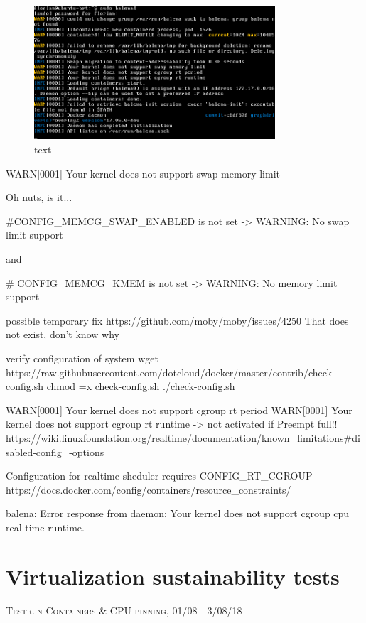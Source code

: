 \documentclass[]{scrartcl}
\begin{document}
\begin{figure}
	\centering
	\includegraphics[width=0.8\textwidth]{balena-err}
	\caption{text}
\end{figure}

WARN[0001] Your kernel does not support swap memory limit 

Oh nuts, is it...

\#CONFIG\_MEMCG\_SWAP\_ENABLED is not set -> WARNING: No swap limit support

and

\# CONFIG\_MEMCG\_KMEM is not set -> WARNING: No memory limit support

possible temporary fix https://github.com/moby/moby/issues/4250
That does not exist, don't know why


verify configuration of system
wget https://raw.githubusercontent.com/dotcloud/docker/master/contrib/check-config.sh
chmod =x check-config.sh
./check-config.sh


WARN[0001] Your kernel does not support cgroup rt period 
WARN[0001] Your kernel does not support cgroup rt runtime 
-> not activated if Preempt full!!
https://wiki.linuxfoundation.org/realtime/documentation/known_limitations#disabled-config_-options


Configuration for realtime sheduler requires CONFIG\_RT\_CGROUP
https://docs.docker.com/config/containers/resource_constraints/

balena: Error response from daemon: Your kernel does not support cgroup cpu real-time runtime.



\section{Virtualization sustainability tests}

{\small\textsc{Testrun Containers \& CPU pinning, 01/08 - 3/08/18} \bigskip}

\end{document}
